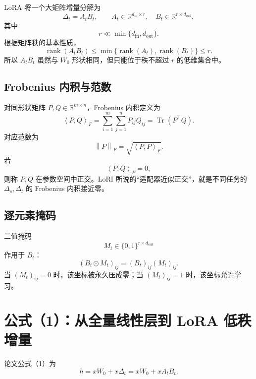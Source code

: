 \documentclass[UTF8,12pt,a4paper,fontset=none]{ctexart}
\numberwithin{equation}{section}
\newcommand{\R}{\mathbb{R}}
\newcommand{\norm}[1]{\left\lVert #1\right\rVert}
\newcommand{\ip}[2]{\left\langle #1,#2\right\rangle_F}
\newcommand{\tr}{\operatorname{Tr}}
\newcommand{\rank}{\operatorname{rank}}
\begin{document}
LoRA 将一个大矩阵增量分解为
\begin{equation}
  \Delta_t=A_tB_t,
  \qquad
  A_t\in\R^{d_{\mathrm{in}}\times r},
  \quad
  B_t\in\R^{r\times d_{\mathrm{out}}},
\end{equation}
其中
\begin{equation}
  r\ll \min\{d_{\mathrm{in}},d_{\mathrm{out}}\}.
\end{equation}
根据矩阵秩的基本性质，
\begin{equation}
  \rank(A_tB_t)
  \leq \min\{\rank(A_t),\rank(B_t)\}
  \leq r.
\end{equation}
所以 $A_tB_t$ 虽然与 $W_0$ 形状相同，但只能位于秩不超过 $r$ 的低维集合中。

\subsection{Frobenius 内积与范数}

对同形状矩阵 $P,Q\in\R^{m\times n}$，Frobenius 内积定义为
\begin{equation}
  \ip{P}{Q}
  =\sum_{i=1}^{m}\sum_{j=1}^{n}P_{ij}Q_{ij}
  =\tr(P^{\top}Q).
\end{equation}
对应范数为
\begin{equation}
  \norm{P}_F=\sqrt{\ip{P}{P}}.
\end{equation}
若
\begin{equation}
  \ip{P}{Q}=0,
\end{equation}
则称 $P,Q$ 在参数空间中正交。LoRI 所说的“适配器近似正交”，就是不同任务的 $\Delta_s,\Delta_t$ 的 Frobenius 内积接近零。

\subsection{逐元素掩码}

二值掩码
\begin{equation}
  M_t\in\{0,1\}^{r\times d_{\mathrm{out}}}
\end{equation}
作用于 $B_t$：
\begin{equation}
  (B_t\odot M_t)_{ij}=(B_t)_{ij}(M_t)_{ij}.
\end{equation}
当 $(M_t)_{ij}=0$ 时，该坐标被永久压成零；当 $(M_t)_{ij}=1$ 时，该坐标允许学习。

\section{公式（1）：从全量线性层到 LoRA 低秩增量}

论文公式（1）为
\begin{equation}
  h=xW_0+x\Delta_t=xW_0+xA_tB_t.
  \tag{1}
  \label{eq:paper1}
\end{equation}
\end{document}
